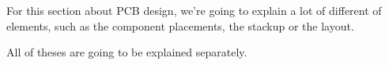 For this section about PCB design, we're going to explain a lot of different
of elements, such as the component placements, the stackup or the layout.

All of theses are going to be explained separately.